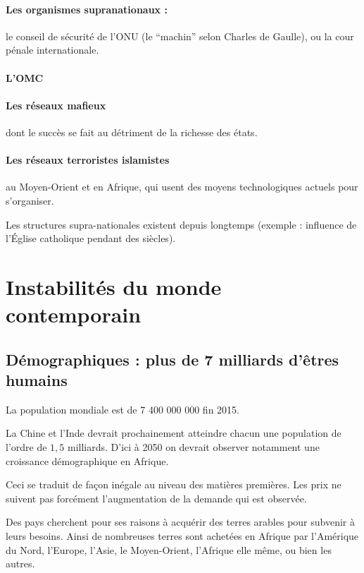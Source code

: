 \documentclass[a4paper,10pt]{article}
\begin{document}
		\paragraph{Les organismes supranationaux :}
			le conseil de sécurité de l'ONU (le “machin” selon Charles de Gaulle), ou la cour pénale internationale.

		\paragraph{L'OMC}

		\paragraph{Les réseaux mafieux}
			dont le succès se fait au détriment de la richesse des états.

		\paragraph{Les réseaux terroristes islamistes}
			au Moyen-Orient et en Afrique, qui usent des moyens technologiques actuels pour s'organiser.

		Les structures supra-nationales existent depuis longtemps (exemple : influence de l'Église catholique pendant des siècles).

\section{Instabilités du monde contemporain}

	\subsection{Démographiques : plus de 7 milliards d’êtres humains}

		La population mondiale est de 7 400 000 000 fin 2015.

		La Chine et l'Inde devrait prochainement atteindre chacun une population de l'ordre de $1{,}5$ milliards.
		D'ici à 2050 on devrait observer notamment une croissance démographique en Afrique.

		Ceci se traduit de façon inégale au niveau des matières premières.
		Les prix ne suivent pas forcément l'augmentation de la demande qui est observée.

		Des pays cherchent pour ses raisons à acquérir des terres arables pour subvenir à leurs besoins.
		Ainsi de nombreuses terres sont achetées en Afrique par l'Amérique du Nord, l'Europe, l'Asie, le Moyen-Orient, l'Afrique elle même, ou bien les autres.
\end{document}
